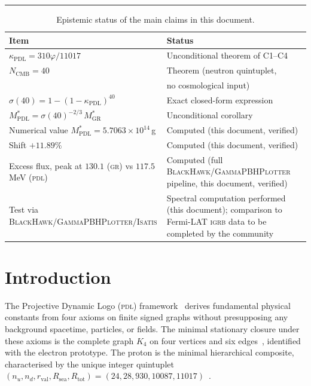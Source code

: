 \documentclass[12pt, a4paper]{article}
\theoremstyle{definition}
\newcommand{\PDL}{\textsc{pdl}}
\newcommand{\Rtot}{R_{\mathrm{tot}}}
\newcommand{\Nsea}{R_{\mathrm{sea}}}
\newcommand{\rval}{r_{\mathrm{val}}}
\newcommand{\kappaPDL}{\kappa_{\mathrm{PDL}}}
\newcommand{\MstarGR}{M^{*}_{\mathrm{GR}}}
\newcommand{\MstarPDL}{M^{*}_{\mathrm{PDL}}}
\newcommand{\NCMB}{N_{\mathrm{CMB}}}
\newcommand{\phigold}{\varphi}
\begin{document}
\clearpage

\vspace{6pt}
\hrule
\vspace{14pt}

\begin{table}[h]
\centering
\small
\begin{tabular}{ll}
\toprule
\textbf{Item} & \textbf{Status} \\
\midrule
$\kappaPDL = 310\phigold/11017$ & Unconditional theorem of C1--C4~\cite{D39,D42} \\
$\NCMB = 40$ & Theorem (neutron quintuplet, \\ & no cosmological input)~\cite{D27} \\
$\sigma(40) = 1-(1-\kappaPDL)^{40}$ & Exact closed-form expression \\
$\MstarPDL = \sigma(40)^{-2/3}\,\MstarGR$ & Unconditional corollary~\cite{D38} \\
Numerical value $\MstarPDL = 5.7063\times10^{14}$\,g & Computed (this document, verified) \\
Shift $+11.89\%$ & Computed (this document, verified) \\
Excess flux, peak at $130.1$ (\textsc{gr}) vs $117.5$\,MeV (\PDL) & Computed (full \textsc{BlackHawk}/\textsc{GammaPBHPlotter} pipeline, this document, verified) \\
Test via \textsc{BlackHawk}/\textsc{GammaPBHPlotter}/\textsc{Isatis} & Spectral computation performed (this document); comparison to Fermi-LAT \textsc{igrb} data to be completed by the community \\
\bottomrule
\end{tabular}
\caption{Epistemic status of the main claims in this document.}
\label{tab:epistemic}
\end{table}

\tableofcontents

\newpage

\section{Introduction}

The Projective Dynamic Logo (\PDL) framework~\cite{D01,D02} derives fundamental physical constants from four axioms on finite signed graphs without presupposing any background spacetime, particles, or fields. The minimal stationary closure under these axioms is the complete graph $K_4$ on four vertices and six edges~\cite{D16a}, identified with the electron prototype. The proton is the minimal hierarchical composite, characterised by the unique integer quintuplet $(n_u, n_d, \rval, \Nsea, \Rtot) = (24, 28, 930, 10087, 11017)$~\cite{D16b,D29}.
\end{document}
